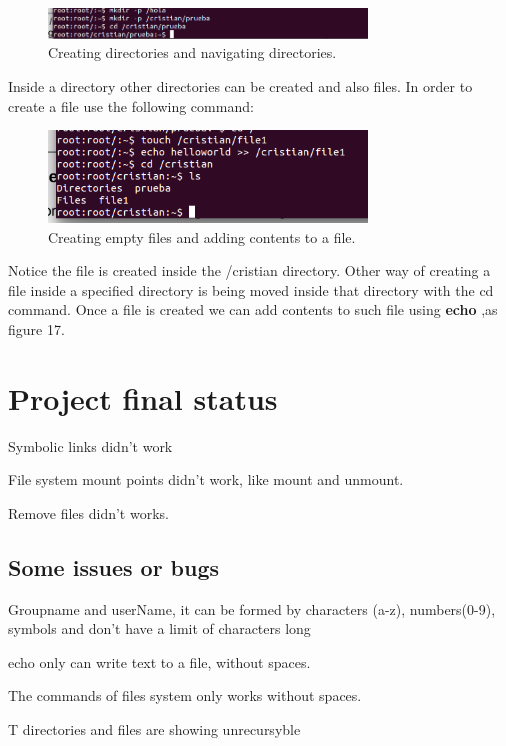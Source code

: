 \documentclass{aes2e}
\begin{document}
\begin{itemize}
\begin{figure}[ht]
\centering
\includegraphics[width=20pc]{directory.png}
\caption{Creating directories and navigating directories.}
\end{figure}
Inside a directory other directories can be created and also files. In order to create a file use the following command: \newline\newline
\begin{figure}[ht]
\centering
\includegraphics[width=20pc]{files.png}
\caption{Creating empty files and adding contents to a file.}
\end{figure}
Notice the file is created inside the /cristian directory. Other way of creating a file inside a specified directory is being moved inside that directory with the cd command.\newline
Once a file is created we can add contents to such file using \textbf{ echo} ,as figure 17.
\end{itemize}


\section{Project final status}

Symbolic links didn't work \newline

File system mount points didn't work, like mount and unmount.\newline

Remove files didn't works.\newline



\subsection{Some issues or bugs}
\begin{paralist}
\item{}Groupname and userName, it can be formed by characters (a-z), numbers(0-9), symbols and don't have a limit of  characters long\newline
\item{} echo only can write text to a file, without spaces.\newline
\item{}The commands of files system only works without spaces.\newline
\item{}T directories and files are showing unrecursyble

\end{paralist}
\end{document}
